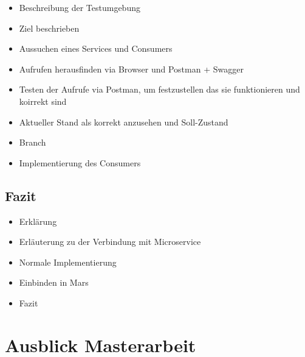 \documentclass{llncs}
\begin{document}
\begin{itemize}
\item Beschreibung der Testumgebung
\item Ziel beschrieben
\item Aussuchen eines Services und Consumers
\item Aufrufen herausfinden via Browser und Postman + Swagger
\item Testen der Aufrufe via Postman, um festzustellen das sie funktionieren und koirrekt sind
\item Aktueller Stand als korrekt anzusehen und Soll-Zustand
\item Branch
\item Implementierung des Consumers
\end{itemize}

\subsection{Fazit}
\begin{itemize}
\item Erklärung
\item Erläuterung zu der Verbindung mit Microservice
\item Normale Implementierung
\item Einbinden in Mars
\item Fazit
\end{itemize}
\section{Ausblick Masterarbeit}





\end{document}
